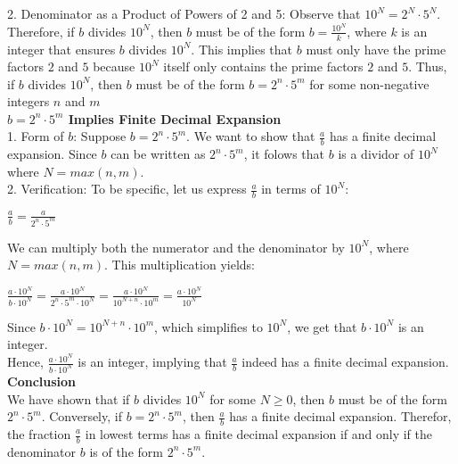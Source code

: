 \documentclass{article}
\begin{document}
2. Denominator as a Product of Powers of 2 and 5: Observe that $10^N = 2^N \cdot 5^N$. Therefore, if $b$ divides $10^N$, then $b$ must be of the form $b = \frac{10^N}{k}$, where $k$ is an integer that ensures $b$ divides $10^N$. This implies that $b$ must only have the prime factors $2$ and $5$ because $10^N$ itself only contains the prime factors $2$ and $5$. Thus, if $b$ divides $10^N$, then $b$ must be of the form $b = 2^n \cdot 5^m$ for some non-negative integers $n$ and $m$\\

\textbf{$b = 2^n \cdot 5^m$ Implies Finite Decimal Expansion}\\

1. Form of $b$: Suppose $b = 2^n \cdot 5^m$. We want to show that $\frac{a}{b}$ has a finite decimal expansion. Since $b$ can be written as $2^n \cdot 5^m$, it folows that $b$ is a dividor of $10^N$ where $N = max(n, m)$.\\

2. Verification: To be specific, let us express $\frac{a}{b}$ in terms of $10^N$:\\

\begin{center}$\frac{a}{b} = \frac{a}{2^n \cdot 5^m}$\\\end{center}

We can multiply both the numerator and the denominator by $10^N$, where $N = max(n, m)$. This multiplication yields:\\

\begin{center} $\frac{a \cdot 10^N}{b \cdot 10^N} = \frac{a \cdot 10^N}{2^n \cdot 5^m \cdot 10^N} = \frac{a \cdot 10^N}{10^{N+n} \cdot 10^m} = \frac{a \cdot 10^N}{10^N}$\\\end{center}

\noindent Since $b \cdot 10^N = 10^{N+n} \cdot 10^m$, which simplifies to $10^N$, we get that $b \cdot 10^N$ is an integer.\\
Hence, $\frac{a \cdot 10^N}{b \cdot 10^N}$ is an integer, implying that $\frac{a}{b}$ indeed has a finite decimal expansion.\\

\textbf{Conclusion}\\

We have shown that if $b$ divides $10^N$ for some $N \geq 0$, then $b$ must be of the form $2^n \cdot 5^m$. Conversely, if $b = 2^n \cdot 5^m$, then $\frac{a}{b}$ has a finite decimal expansion. Therefor, the fraction $\frac{a}{b}$ in lowest terms has a finite decimal expansion if and only if the denominator $b$ is of the form $2^n \cdot 5^m$.\\
\end{document}
